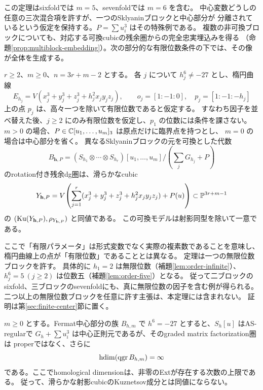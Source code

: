 この定理はsixfoldでは \(m=5\)、sevenfoldでは \(m=6\) を含む。
中心変数どうしの任意の三次混合項を許すが、一つのSklyaninブロックと中心部分が
分離されているという仮定を保持する。\(P=\sum u_i^3\) はその特殊例である。
複数の非可換ブロックについても、対応する可換cubicの残余圏からの完全忠実埋込みを得る
（命題\ref{prop:multiblock-embedding}）。次の部分的な有限位数条件の下では、その像が全体を生成する。

\begin{theorem}[一つの任意位数ブロックを許す多ブロック可換モデル]\label{thm:multiblock-model}
 \(r\ge2\)、\(m\ge0\)、\(n=3r+m-2\) とする。
 各 \(j\) について \(h_j^6\ne-27\) とし、楕円曲線
 \[
 E_{h_j}=V(x_j^3+y_j^3+z_j^3+h_j^2x_jy_jz_j),\qquad
 o_j=[1:-1:0],\quad p_j=[1:-1:-h_j]
 \]
 上の点 \(p_j\) は、高々一つを除いて有限位数であると仮定する。
 すなわち因子を並べ替えた後、\(j\ge2\) にのみ有限位数を仮定し、\(p_1\) の位数には条件を課さない。
 \(m>0\) の場合、\(P\in\mathbb C[u_1,\ldots,u_m]_3\) は原点だけに臨界点を持つとし、
 \(m=0\) の場合は中心部分を省く。
 異なるSklyaninブロックの元を可換とした代数
 \[
 B_{\mathbf h,P}=
 (S_{h_1}\otimes\cdots\otimes S_{h_r})[u_1,\ldots,u_m]
 \big/\left(\sum_jG_{h_j}+P\right)
 \]
 のrotation付き残余dg圏は、滑らかなcubic
 \[
 Y_{\mathbf h,P}=V\!\left(
 \sum_{j=1}^r(x_j^3+y_j^3+z_j^3+h_j^2x_jy_jz_j)+P(u)
 \right)\subset\mathbb P^{3r+m-1}
 \]
 の \((\operatorname{Ku}(Y_{\mathbf h,P}),\rho_{Y_{\mathbf h,P}})\) と同値である。
 この可換モデルは射影同型を除いて一意である。
\end{theorem}

ここで「有限パラメータ」は形式変数でなく実際の複素数であることを意味し、
楕円曲線上の点が「有限位数」であることとは異なる。
定理は一つの無限位数ブロックを許す。
具体的に \(h_1=2\) は無限位数（補題\ref{lem:order-infinite}）、
\(h_j^6=5\ (j\ge2)\) は位数五（補題\ref{lem:order-five}）となる。
従って二ブロックのsixfold、三ブロックのsevenfoldにも、真に無限位数の因子を含む例が得られる。
二つ以上の無限位数ブロックを任意に許す主張は、本定理には含まれない。
証明は第\ref{sec:finite-center}節に置く。

\begin{proposition}\label{prop:bad-intro}
 \(m\ge0\) とする。Fermat中心部分の族 \(B_{h,m}\) で \(h^6=-27\) とすると、\(S_h[u]\) はAS-regularで
 \(G_h+\sum u_i^3\) は中心正則元であるが、そのgraded matrix factorization圏は
 properではなく、さらに
 \[
 \operatorname{hdim}(\operatorname{qgr} B_{h,m})=\infty
 \]
 である。ここでhomological dimensionは、非零のExtが存在する次数の上限である。
 従って、滑らかな射影cubicのKuznetsov成分とは同値にならない。
\end{proposition}

